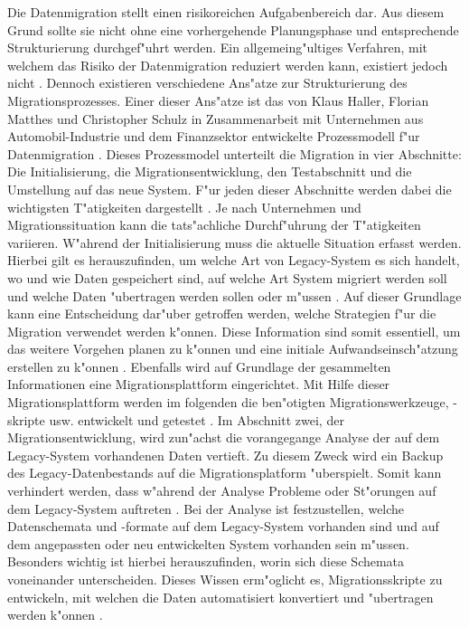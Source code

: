 Die Datenmigration stellt einen risikoreichen Aufgabenbereich dar. Aus diesem Grund sollte sie nicht ohne eine vorhergehende Planungsphase und entsprechende Strukturierung durchgef"uhrt werden. Ein allgemeing"ultiges Verfahren, mit welchem das Risiko der Datenmigration reduziert werden kann, existiert jedoch nicht \citep[S.~3]{wuLawless-1997}. Dennoch existieren verschiedene Ans"atze zur Strukturierung des Migrationsprozesses. Einer dieser Ans"atze ist das von Klaus Haller, Florian Matthes und Christopher Schulz in Zusammenarbeit mit Unternehmen aus Automobil-Industrie und dem Finanzsektor entwickelte Prozessmodell f"ur Datenmigration \citep[S.~2f.]{klausMatthesSchulz-2012}. 
\lb
Dieses Prozessmodel unterteilt die Migration in vier Abschnitte: Die Initialisierung, die Migrationsentwicklung, den Testabschnitt und die Umstellung auf das neue System. F"ur jeden dieser Abschnitte werden dabei die wichtigsten T"atigkeiten dargestellt \citep[S.~5f]{klausMatthesSchulz-2012}. Je nach Unternehmen und Migrationssituation kann die tats"achliche Durchf"uhrung der T"atigkeiten variieren.
\lb
W"ahrend der Initialisierung muss die aktuelle Situation erfasst werden. Hierbei gilt es herauszufinden, um welche Art von Legacy-System es sich handelt, wo und wie Daten gespeichert sind, auf welche Art System migriert werden soll und welche Daten "ubertragen werden sollen oder m"ussen \citep[S.~7]{klausMatthesSchulz-2012}. Auf dieser Grundlage kann eine Entscheidung dar"uber getroffen werden, welche Strategien f"ur die Migration verwendet werden k"onnen. Diese Information sind somit essentiell, um das weitere Vorgehen planen zu k"onnen und eine initiale Aufwandseinsch"atzung erstellen zu k"onnen \citep[S.~7]{klausMatthesSchulz-2012}. Ebenfalls wird auf Grundlage der gesammelten Informationen eine Migrationsplattform eingerichtet. Mit Hilfe dieser Migrationsplattform werden im folgenden die ben"otigten Migrationswerkzeuge, -skripte usw. entwickelt und getestet \citep[S.~7]{klausMatthesSchulz-2012}.
\lb
Im Abschnitt zwei, der Migrationsentwicklung, wird zun"achst die vorangegange Analyse der auf dem Legacy-System vorhandenen Daten vertieft. Zu diesem Zweck wird ein Backup des Legacy-Datenbestands auf die Migrationsplatform "uberspielt. Somit kann verhindert werden, dass w"ahrend der Analyse Probleme oder St"orungen auf dem Legacy-System auftreten \citep[S.~7]{klausMatthesSchulz-2012}. Bei der Analyse ist festzustellen, welche Datenschemata und -formate auf dem Legacy-System vorhanden sind und auf dem angepassten oder neu entwickelten System vorhanden sein m"ussen. Besonders wichtig ist hierbei herauszufinden, worin sich diese Schemata voneinander unterscheiden. Dieses Wissen erm"oglicht es, Migrationsskripte zu entwickeln, mit welchen die Daten automatisiert konvertiert und "ubertragen werden k"onnen \citep[S.~7f.]{klausMatthesSchulz-2012}. 

